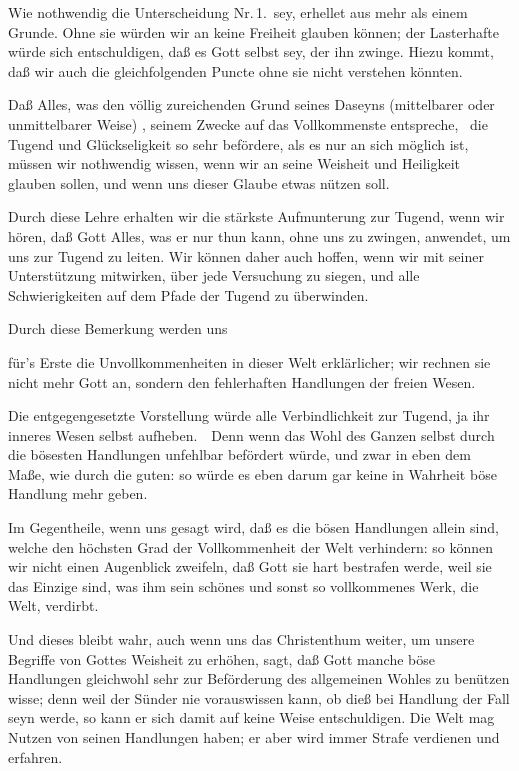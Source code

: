 \begin{aufza}
\item Wie nothwendig die Unterscheidung Nr.\,1.\ sey, erhellet aus mehr als einem Grunde. Ohne sie würden wir an keine Freiheit glauben können; der Lasterhafte würde sich entschuldigen, daß es Gott selbst sey, der ihn zwinge. Hiezu kommt, daß wir auch die gleichfolgenden Puncte ohne sie nicht verstehen könnten.
\item Daß Alles, was den völlig zureichenden Grund seines Daseyns (mittelbarer oder unmittelbarer Weise) , seinem Zwecke auf das Vollkommenste entspreche, \dh\ die Tugend und Glückseligkeit so sehr befördere, als es nur an sich möglich ist, müssen wir nothwendig wissen, wenn wir an seine Weisheit und Heiligkeit glauben sollen, und wenn uns dieser Glaube etwas nützen soll.
\item Durch diese Lehre erhalten wir die stärkste Aufmunterung zur Tugend, wenn wir hören, daß Gott Alles, was er nur thun kann, ohne uns zu zwingen, anwendet, um uns zur Tugend zu leiten. Wir können daher auch hoffen, wenn wir mit seiner Unterstützung mitwirken, über jede Versuchung zu siegen, und alle Schwierigkeiten auf dem Pfade der Tugend zu überwinden.
\item Durch diese Bemerkung werden uns
\begin{aufzb}
\item für's Erste die Unvollkommenheiten in dieser Welt erklärlicher; wir rechnen sie nicht mehr Gott an, sondern den fehlerhaften Handlungen der freien Wesen.
\item Die entgegengesetzte Vorstellung würde alle Verbindlichkeit zur Tugend, ja ihr inneres Wesen selbst aufheben.~\ Denn wenn das Wohl des Ganzen selbst durch die bösesten Handlungen unfehlbar befördert würde, und zwar in eben dem Maße, wie durch die guten: so würde es eben darum gar keine in Wahrheit böse Handlung mehr geben.
\item Im Gegentheile, wenn uns gesagt wird, daß es die bösen Handlungen allein sind, welche den höchsten Grad der Vollkommenheit der Welt verhindern: so können wir nicht einen Augenblick zweifeln, daß Gott sie hart bestrafen werde, weil sie das Einzige sind, was ihm sein schönes und sonst so vollkommenes Werk, die Welt, verdirbt.
\item Und dieses bleibt wahr, auch wenn uns das Christenthum weiter, um unsere Begriffe von Gottes Weisheit zu erhöhen, sagt, daß Gott manche böse Handlungen gleichwohl sehr zur Beförderung des allgemeinen Wohles zu benützen wisse; denn weil der Sünder nie vorauswissen kann, ob dieß bei  Handlung der Fall seyn werde, so kann er sich damit auf keine Weise entschuldigen. Die Welt mag Nutzen von seinen Handlungen haben; er aber wird immer Strafe verdienen und erfahren.

\end{aufzb}
\end{aufza}
